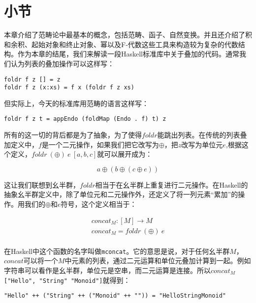 \documentclass{article}
\begin{document}
\begin{Exercise}
\end{Exercise}

\section{小节}

本章介绍了范畴论中最基本的概念，包括范畴、函子、自然变换。并且还介绍了积和余积、起始对象和终止对象、幂以及F-代数这些工具来构造较为复杂的代数结构。作为本章的结尾，我们来解读一段Haskell标准库中关于叠加的代码\cite{Haskell-foldable}。通常我们认为列表的叠加操作可以这样写：

\lstset{language=Haskell, frame=single}
 \begin{lstlisting}
foldr f z [] = z
foldr f z (x:xs) = f x (foldr f z xs)
\end{lstlisting}

但实际上，今天的标准库用范畴的语言这样写：

\lstset{frame=single}
\begin{lstlisting}
foldr f z t = appEndo (foldMap (Endo . f) t) z
\end{lstlisting}

所有的这一切的背后都是为了抽象，为了使得$foldr$能跳出列表。在传统的列表叠加定义中，$f$是一个二元操作，如果我们把它改写为$\oplus$，把$z$改写为单位元$e$,根据这个定义，$foldr\ (\oplus)\ e\ [a, b, c]$就可以展开成为：

\[
a \oplus (b \oplus (c \oplus e))
\]

这让我们联想到幺半群，$foldr$相当于在幺半群上重复进行二元操作。在Haskell的抽象幺半群定义中，除了单位元和二元操作外，还定义了将一列元素“累加”的操作。用我们的$\oplus$和$e$符号，这个定义相当于：

\[
\begin{array}{l}
concat_M : [M] \to M \\
concat_M = foldr\ (\oplus)\ e \\
\end{array}
\]

在Haskell中这个函数的名字叫做\texttt{mconcat}。它的意思是说，对于任何幺半群$M$，$concat$可以将一个$M$中元素的列表，通过二元运算和单位元叠加计算到一起。例如字符串可以看作是幺半群，单位元是空串，而二元运算是连接。所以$concat_M$ \texttt{["Hello", "String" "Monoid"]}就得到：

\begin{verbatim}
"Hello" ++ ("String" ++ ("Monoid" ++ "")) = "HelloStringMonoid"
\end{verbatim}
\end{document}
